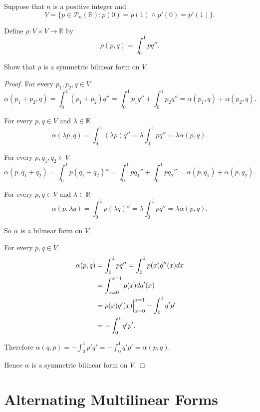 \begin{exercise}\label{chapter9:sectionA:exercise10}
    Suppose that $n$ is a positive integer and
    \[
        V = \{ p\in\mathscr{P}_{n}(\mathbb{R}): p(0) = p(1) \land p'(0) = p'(1) \}.
    \]

    Define $\rho: V\times V\to\mathbb{R}$ by
    \[
        \rho(p, q) = \int^{1}_{0}pq''.
    \]

    Show that $\rho$ is a symmetric bilinear form on $V$.
\end{exercise}

\begin{proof}
    For every $p_{1}, p_{2}, q \in V$
    \[
        \alpha(p_{1} + p_{2}, q) = \int^{1}_{0}(p_{1} + p_{2})q'' = \int^{1}_{0}p_{1}q'' + \int^{1}_{0}p_{2}q'' = \alpha(p_{1}, q) + \alpha(p_{2}, q).
    \]

    For every $p, q\in V$ and $\lambda\in\mathbb{R}$
    \[
        \alpha(\lambda p, q) = \int^{1}_{0}(\lambda p)q'' = \lambda\int^{1}_{0}pq'' = \lambda\alpha(p, q).
    \]

    For every $p, q_{1}, q_{2}\in V$
    \[
        \alpha(p, q_{1} + q_{2}) = \int^{1}_{0}p(q_{1} + q_{2})'' = \int^{1}_{0}pq_{1}'' + \int^{1}_{0}pq_{2}'' = \alpha(p, q_{1}) + \alpha(p, q_{2}).
    \]

    For every $p, q\in V$ and $\lambda\in\mathbb{R}$
    \[
        \alpha(p, \lambda q) = \int^{1}_{0}p(\lambda q)'' = \lambda\int^{1}_{0}pq'' = \lambda\alpha(p, q).
    \]

    So $\alpha$ is a bilinear form on $V$.

    For every $p, q\in V$
    \begin{align*}
        \alpha(p, q) & = \int^{1}_{0}pq'' = \int^{1}_{0}p(x)q''(x)dx         \\
                     & = \int^{x=1}_{x=0}p(x)dq'(x)                          \\
                     & = p(x)q'(x)\Big{\vert}^{x=1}_{x=0} - \int^{1}_{0}q'p' \\
                     & = -\int^{1}_{0}q'p'.
    \end{align*}

    Therefore $\alpha(q, p) = -\int^{1}_{0}p'q' = -\int^{1}_{0}q'p' = \alpha(p, q)$.

    Hence $\alpha$ is a symmetric bilinear form on $V$.
\end{proof}
\newpage

\section{Alternating Multilinear Forms}

